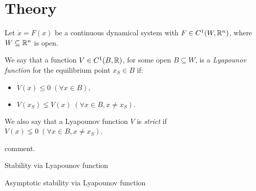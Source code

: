 \chapter{Theory}

\begin{definizione} %
    Let $\dot{x} = F(x)$ be a continuous dynamical system with $F \in C^1(W,\mathbb{R}^n)$, where $W \subseteq \mathbb{R}^n$ is open.

    We say that a function $V \in C^1(B, \mathbb{R})$, for some open $B \subseteq W$, is a \emph{Lyapounov function} for the equilibrium point $x_S \in B$ if:
    \begin{itemize}
        \item $\dot{V} (x) \leq 0 \; (\forall x \in B),$
        \item $V(x_S) \lneq V(x) \; (\forall x \in B, x \neq x_S).$
    \end{itemize}

    We also say that a Lyapounov function $V$ is \emph{strict} if $\dot{V}(x) \lneq 0 \; (\forall x \in B, x \neq x_S)$.
\end{definizione}

comment.

\begin{teorema}{Stability via Lyapounov function}

\end{teorema}

\begin{corollario}{Asymptotic stability via Lyapounov function}

\end{corollario}
